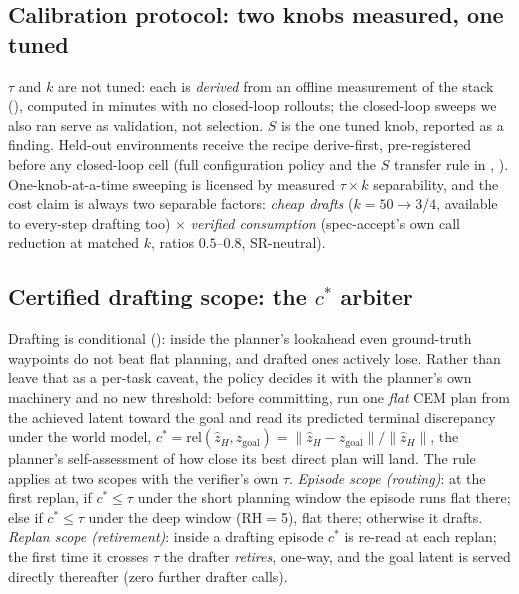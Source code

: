 \documentclass{article}
\begin{document}
\subsection{Calibration protocol: two knobs measured, one tuned}
\label{sec:method-config}
$\tau$ and $k$ are not tuned: each is \emph{derived} from an offline
measurement of the stack (), computed in minutes with no
closed-loop rollouts; the closed-loop sweeps we also ran serve as validation,
not selection. $S$ is the one tuned knob, reported as a finding. Held-out
environments receive the recipe derive-first, pre-registered before any
closed-loop cell (full configuration policy and the $S$ transfer rule in
, ). One-knob-at-a-time sweeping is
licensed by measured $\tau{\times}k$ separability, and the cost claim is
always two separable factors: \emph{cheap drafts} ($k{=}50{\to}3$/$4$,
available to every-step drafting too) $\times$ \emph{verified consumption}
(spec-accept's own call reduction at matched $k$, ratios $0.5$--$0.8$,
SR-neutral).

\subsection{Certified drafting scope: the $c^{*}$ arbiter}
\label{sec:method-arbiter}
Drafting is conditional (): inside the planner's
lookahead even ground-truth waypoints do not beat flat planning, and drafted
ones actively lose. Rather than leave that as a per-task caveat, the policy
decides it with the planner's own machinery and no new threshold: before
committing, run one \emph{flat} CEM plan from the achieved latent toward the
goal and read its predicted terminal discrepancy under the world model,
$c^{*} = \mathrm{rel}(\hat z_{H}, z_{\mathrm{goal}}) =
\lVert \hat z_{H}-z_{\mathrm{goal}}\rVert / \lVert \hat z_{H}\rVert$,
the planner's self-assessment of how close its best direct plan will land. The
rule applies at two scopes with the verifier's own $\tau$. \emph{Episode scope
(routing)}: at the first replan, if $c^{*}\!\le\tau$ under the short planning
window the episode runs flat there; else if $c^{*}\!\le\tau$ under the deep
window (RH$=$5), flat there; otherwise it drafts. \emph{Replan scope
(retirement)}: inside a drafting episode $c^{*}$ is re-read at each replan;
the first time it crosses $\tau$ the drafter \emph{retires}, one-way, and the
goal latent is served directly thereafter (zero further drafter calls).
\end{document}
